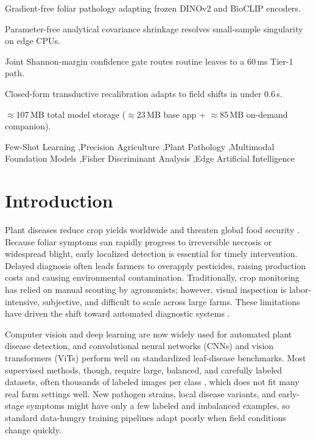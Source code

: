\documentclass[preprint,12pt]{elsarticle}
\begin{document}
\begin{frontmatter}
\begin{highlights}
\item Gradient-free foliar pathology adapting frozen DINOv2 and BioCLIP encoders.
\item Parameter-free analytical covariance shrinkage resolves small-sample singularity on edge CPUs.
\item Joint Shannon-margin confidence gate routes routine leaves to a 60\,ms Tier-1 path.
\item Closed-form transductive recalibration adapts to field shifts in under 0.6\,s.
\item $\approx$107\,MB total model storage ($\approx$23\,MB base app + $\approx$85\,MB on-demand companion).
\end{highlights}

\begin{keyword}
Few-Shot Learning \sep Precision Agriculture \sep Plant Pathology \sep Multimodal Foundation Models \sep Fisher Discriminant Analysis \sep Edge Artificial Intelligence
\end{keyword}

\end{frontmatter}

\section{Introduction}
\label{sec:intro}
Plant diseases reduce crop yields worldwide and threaten global food security \cite{richard2022control}. Because foliar symptoms can rapidly progress to irreversible necrosis or widespread blight, early localized detection is essential for timely intervention. Delayed diagnosis often leads farmers to overapply pesticides, raising production costs and causing environmental contamination. Traditionally, crop monitoring has relied on manual scouting by agronomists; however, visual inspection is labor-intensive, subjective, and difficult to scale across large farms. These limitations have driven the shift toward automated diagnostic systems \cite{shafik2023systematic}.

Computer vision and deep learning are now widely used for automated plant disease detection, and convolutional neural networks (CNNs) and vision transformers (ViTs) perform well on standardized leaf-disease benchmarks. Most supervised methods, though, require large, balanced, and carefully labeled datasets, often thousands of labeled images per class \cite{shoaib2023advanced}, which does not fit many real farm settings well. New pathogen strains, local disease variants, and early-stage symptoms might have only a few labeled and imbalanced examples, so standard data-hungry training pipelines adapt poorly when field conditions change quickly.
\end{document}
